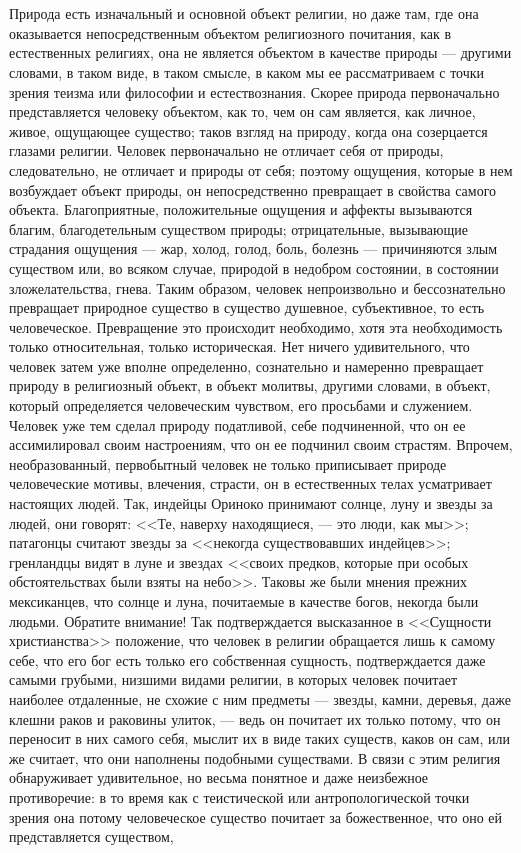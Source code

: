 \documentclass[12pt,oneside]{book}
\begin{document}
\chapter{}

Природа есть изначальный и основной объект религии, но даже там, где она оказывается непосредственным объектом религиозного почитания, как в естественных религиях, она не является объектом в качестве природы --- другими словами, в таком виде, в таком смысле, в каком мы ее рассматриваем с точки зрения теизма или философии и естествознания. Скорее природа первоначально представляется человеку объектом, как то, чем он сам является, как личное, живое, ощущающее существо; таков взгляд на природу, когда она созерцается глазами религии. Человек первоначально не отличает себя от природы, следовательно, не отличает и природы от себя; поэтому ощущения, которые в нем возбуждает объект природы, он непосредственно превращает в свойства самого объекта. Благоприятные, положительные ощущения и аффекты вызываются благим, благодетельным существом природы; отрицательные, вызывающие страдания ощущения --- жар, холод, голод, боль, болезнь --- причиняются злым существом или, во всяком случае, природой в недобром состоянии, в состоянии зложелательства, гнева. Таким образом, человек непроизвольно и бессознательно превращает природное существо в существо душевное, субъективное, то есть человеческое. Превращение это происходит необходимо, хотя эта необходимость только относительная, только историческая. Нет ничего удивительного, что человек затем уже вполне определенно, сознательно и намеренно превращает природу в религиозный объект, в объект молитвы, другими словами, в объект, который определяется человеческим чувством, его просьбами и служением. Человек уже тем сделал природу податливой, себе подчиненной, что он ее ассимилировал своим настроениям, что он ее подчинил своим страстям. Впрочем, необразованный, первобытный человек не только приписывает природе человеческие мотивы, влечения, страсти, он в естественных телах усматривает настоящих людей. Так, индейцы Ориноко принимают солнце, луну и звезды за людей, они говорят: <<Те, наверху находящиеся, --- это люди, как мы>>; патагонцы считают звезды за <<некогда существовавших индейцев>>; гренландцы видят в луне и звездах <<своих предков, которые при особых обстоятельствах были взяты на небо>>. Таковы же были мнения прежних мексиканцев, что солнце и луна, почитаемые в качестве богов, некогда были людьми. Обратите внимание! Так подтверждается высказанное в <<Сущности христианства>> положение, что человек в религии обращается лишь к самому себе, что его бог есть только его собственная сущность, подтверждается даже самыми грубыми, низшими видами религии, в которых человек почитает наиболее отдаленные, не схожие с ним предметы --- звезды, камни, деревья, даже клешни раков и раковины улиток, --- ведь он почитает их только потому, что он переносит в них самого себя, мыслит их в виде таких существ, каков он сам, или же считает, что они наполнены подобными существами. В связи с этим религия обнаруживает удивительное, но весьма понятное и даже неизбежное противоречие: в то время как с теистической или антропологической точки зрения она потому человеческое существо почитает за божественное, что оно ей представляется существом, 
\end{document}
